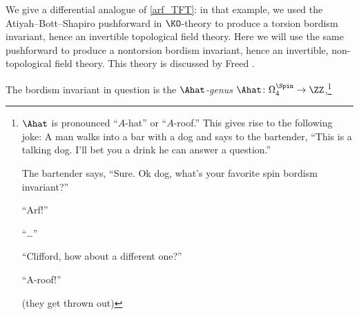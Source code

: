 \begin{example}
We give a differential analogue of \cref{arf_TFT}: in that example, we used the Atiyah--Bott--Shapiro
pushforward \cite{ABS64} in $\KO$-theory to produce a torsion bordism invariant, hence an invertible topological
field theory. Here we will use the same pushforward to produce a nontorsion bordism invariant, hence an invertible,
non-topological field theory. This theory is discussed by Freed \cite[Example 9.24]{Fre19}.

The bordism invariant in question is the \emph{$\Ahat$-genus} $\Ahat\colon
\Omega_4^{\Spin}\to\ZZ$,\footnote{$\Ahat$ is pronounced ``$A$-hat'' or ``$A$-roof.'' This gives rise to the
following joke: A man walks into a bar with a dog and says to the bartender, ``This is a talking dog. I'll bet you
a drink he can answer a question.''

The bartender says, ``Sure. Ok dog, what's your favorite spin bordism invariant?''

``Arf!''

``\dots''

``Clifford, how about a different one?''

``A-roof!''

(they get thrown out)

}
\end{example}
